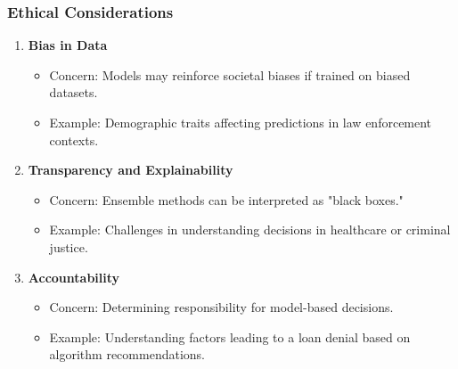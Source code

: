 \documentclass[aspectratio=169]{beamer}
\begin{document}
\begin{frame}[fragile]
    \frametitle{Ethical Considerations}
    \begin{enumerate}
        \item \textbf{Bias in Data}
        \begin{itemize}
            \item Concern: Models may reinforce societal biases if trained on biased datasets.
            \item Example: Demographic traits affecting predictions in law enforcement contexts.
        \end{itemize}

        \item \textbf{Transparency and Explainability}
        \begin{itemize}
            \item Concern: Ensemble methods can be interpreted as "black boxes."
            \item Example: Challenges in understanding decisions in healthcare or criminal justice.
        \end{itemize}

        \item \textbf{Accountability}
        \begin{itemize}
            \item Concern: Determining responsibility for model-based decisions.
            \item Example: Understanding factors leading to a loan denial based on algorithm recommendations.
        \end{itemize}
    \end{enumerate}
\end{frame}
\end{document}
